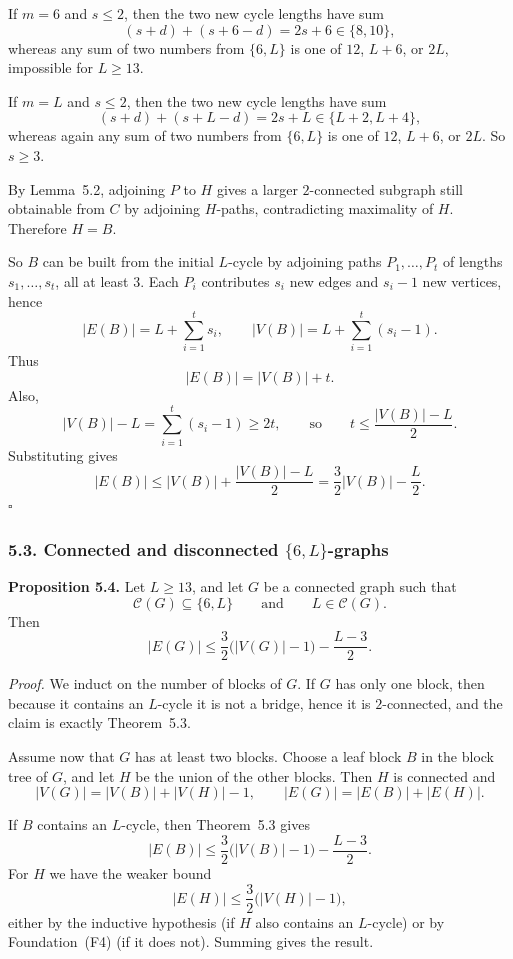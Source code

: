 If $m=6$ and $s\le 2$, then the two new cycle lengths have sum
\[
(s+d)+(s+6-d)=2s+6\in\{8,10\},
\]
whereas any sum of two numbers from $\{6,L\}$ is one of $12$, $L+6$, or $2L$, impossible for $L\ge 13$.

If $m=L$ and $s\le 2$, then the two new cycle lengths have sum
\[
(s+d)+(s+L-d)=2s+L\in\{L+2,L+4\},
\]
whereas again any sum of two numbers from $\{6,L\}$ is one of $12$, $L+6$, or $2L$.
So $s\ge 3$.

By Lemma~5.2, adjoining $P$ to $H$ gives a larger $2$-connected subgraph still obtainable from $C$ by adjoining $H$-paths, contradicting maximality of $H$.
Therefore $H=B$.

So $B$ can be built from the initial $L$-cycle by adjoining paths $P_1,\dots,P_t$ of lengths $s_1,\dots,s_t$, all at least $3$.
Each $P_i$ contributes $s_i$ new edges and $s_i-1$ new vertices, hence
\[
|E(B)|=L+\sum_{i=1}^t s_i,
\qquad
|V(B)|=L+\sum_{i=1}^t (s_i-1).
\]
Thus
\[
|E(B)|=|V(B)|+t.
\]
Also,
\[
|V(B)|-L=\sum_{i=1}^t (s_i-1)\ge 2t,
\qquad\text{so}\qquad
t\le \frac{|V(B)|-L}{2}.
\]
Substituting gives
\[
|E(B)|\le |V(B)|+\frac{|V(B)|-L}{2}=\frac32|V(B)|-\frac L2.
\]
\hfill$\square$

\subsubsection*{5.3. Connected and disconnected $\{6,L\}$-graphs}

\textbf{Proposition 5.4.}
Let $L\ge 13$, and let $G$ be a connected graph such that
\[
\mathcal C(G)\subseteq\{6,L\}
\qquad\text{and}\qquad
L\in\mathcal C(G).
\]
Then
\[
|E(G)|\le \frac32\bigl(|V(G)|-1\bigr)-\frac{L-3}{2}.
\]

\medskip
\textit{Proof.}
We induct on the number of blocks of $G$.
If $G$ has only one block, then because it contains an $L$-cycle it is not a bridge, hence it is $2$-connected, and the claim is exactly Theorem~5.3.

Assume now that $G$ has at least two blocks.
Choose a leaf block $B$ in the block tree of $G$, and let $H$ be the union of the other blocks.
Then $H$ is connected and
\[
|V(G)|=|V(B)|+|V(H)|-1,
\qquad
|E(G)|=|E(B)|+|E(H)|.
\]

If $B$ contains an $L$-cycle, then Theorem~5.3 gives
\[
|E(B)|\le \frac32\bigl(|V(B)|-1\bigr)-\frac{L-3}{2}.
\]
For $H$ we have the weaker bound
\[
|E(H)|\le \frac32\bigl(|V(H)|-1\bigr),
\]
either by the inductive hypothesis (if $H$ also contains an $L$-cycle) or by Foundation~(F4) (if it does not).
Summing gives the result.

